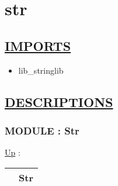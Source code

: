 \chapter*{str}
\hypertarget{ecldoc:toc:str}{}

\section*{\underline{IMPORTS}}
\begin{itemize}
\item lib\_stringlib
\end{itemize}

\section*{\underline{DESCRIPTIONS}}
\subsection*{MODULE : Str}
\hypertarget{ecldoc:Str}{}
\hyperlink{ecldoc:toc:root}{Up} :

{\renewcommand{\arraystretch}{1.5}
\begin{tabularx}{\textwidth}{|>{\raggedright\arraybackslash}l|X|}
\hline
\hspace{0pt} & Str \\
\hline
\end{tabularx}
}

\par


